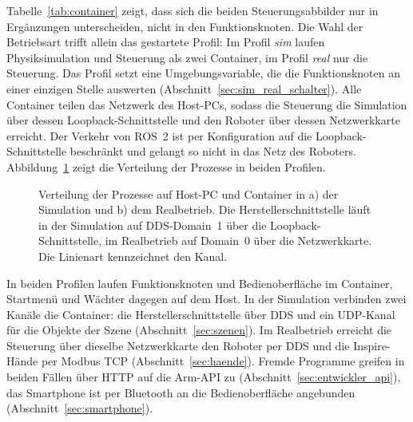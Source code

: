 Tabelle~\ref{tab:container} zeigt, dass sich die beiden Steuerungsabbilder nur in Ergänzungen unterscheiden, nicht in den Funktionsknoten.
Die Wahl der Betriebsart trifft allein das gestartete Profil: Im Profil \emph{sim} laufen Physiksimulation und Steuerung als zwei Container, im Profil \emph{real} nur die Steuerung.
Das Profil setzt eine Umgebungsvariable, die die Funktionsknoten an einer einzigen Stelle auswerten (Abschnitt~\ref{sec:sim_real_schalter}).
Alle Container teilen das Netzwerk des Host-PCs, sodass die Steuerung die Simulation über dessen Loopback-Schnittstelle und den Roboter über dessen Netzwerkkarte erreicht.
Der Verkehr von ROS~2 ist per Konfiguration auf die Loopback-Schnittstelle beschränkt und gelangt so nicht in das Netz des Roboters.
Abbildung~\ref{fig:verteilung} zeigt die Verteilung der Prozesse in beiden Profilen.

\begin{figure}[htbp]
  \centering
  
  \caption[Verteilung der Prozesse auf Host und Container]{Verteilung der Prozesse auf Host-PC und Container in a) der Simulation und b) dem Realbetrieb. Die Herstellerschnittstelle läuft in der Simulation auf DDS-Domain~1 über die Loopback-Schnittstelle, im Realbetrieb auf Domain~0 über die Netzwerkkarte. Die Linienart kennzeichnet den Kanal.}
  \label{fig:verteilung}
\end{figure}

In beiden Profilen laufen Funktionsknoten und Bedienoberfläche im Container, Startmenü und Wächter dagegen auf dem Host.
In der Simulation verbinden zwei Kanäle die Container: die Herstellerschnittstelle über DDS und ein UDP-Kanal für die Objekte der Szene (Abschnitt~\ref{sec:szenen}).
Im Realbetrieb erreicht die Steuerung über dieselbe Netzwerkkarte den Roboter per DDS und die Inspire-Hände per Modbus TCP (Abschnitt~\ref{sec:haende}).
Fremde Programme greifen in beiden Fällen über HTTP auf die Arm-API zu (Abschnitt~\ref{sec:entwickler_api}), das Smartphone ist per Bluetooth an die Bedienoberfläche angebunden (Abschnitt~\ref{sec:smartphone}).

